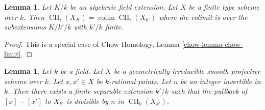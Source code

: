 \documentclass{stacks-project}
\theoremstyle{plain}
\newtheorem{lemma}[subsection]{Lemma}
\theoremstyle{definition}
\theoremstyle{remark}
\numberwithin{equation}{subsection}
\def\colim{\mathop{\mathrm{colim}}\nolimits}
\def\CH{\mathop{\mathrm{CH}}\nolimits}
\begin{document}
\begin{lemma}
\label{lemma-chow-limit}
Let $K/k$ be an algebraic field extension. Let $X$ be a finite type
scheme over $k$. Then $\CH_i(X_K) = \colim \CH_i(X_{k'})$ where the
colimit is over the subextensions $K/k'/k$ with $k'/k$ finite.
\end{lemma}

\begin{proof}
This is a special case of
Chow Homology, Lemma \ref{chow-lemma-chow-limit}.
\end{proof}

\begin{lemma}
\label{lemma-divide-difference-points}
Let $k$ be a field. Let $X$ be a geometrically irreducible
smooth projective scheme over $k$. Let $x, x' \in X$ be $k$-rational points.
Let $n$ be an integer invertible in $k$.
Then there exists a finite separable extension $k'/k$ such that
the pullback of $[x] - [x']$ to $X_{k'}$
is divisible by $n$ in $\CH_0(X_{k'})$.
\end{lemma}
\end{document}
